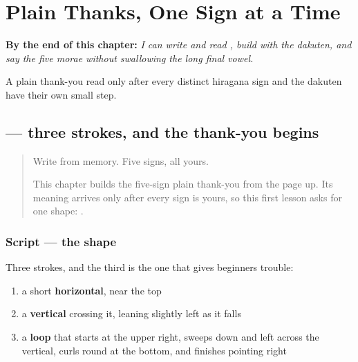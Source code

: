 
\chapter{Plain Thanks, One Sign at a Time}
\label{ch:ja-plain-thanks}

\begin{chapteropening}
\textbf{By the end of this chapter:} \emph{I can write and read , build  with the dakuten, and say the five morae without swallowing the long final vowel.}

A plain thank-you read only after every distinct hiragana sign and the dakuten have their own small step.
\end{chapteropening}

\section[\texorpdfstring{\ja{あ} (a)}{あ (a)}]{ — three strokes, and the thank-you begins}

\label{lesson:JA-W03-a}



\begin{quote}
Write  from memory. Five signs, all yours.

This chapter builds the five-sign plain thank-you from the page up. Its meaning arrives only after every sign is yours, so this first lesson asks for one shape: \textbf{}.
\end{quote}

\subsection*{Script — the shape}

\begin{quote}
\end{quote}

Three strokes, and the third is the one that gives beginners trouble:

\begin{enumerate}
\raggedright
  \item a short \textbf{horizontal}, near the top
  \item a \textbf{vertical} crossing it, leaning slightly left as it falls
  \item a \textbf{loop} that starts at the upper right, sweeps down and left across the vertical, curls round at the bottom, and finishes pointing right
\end{enumerate}

